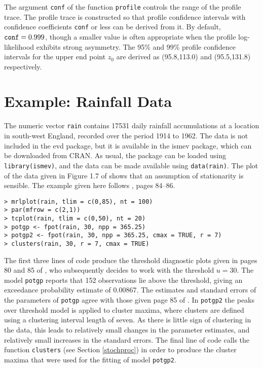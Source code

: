\documentclass[11pt,a4paper]{article}
\begin{document}
The argument \verb+conf+ of the function \verb+profile+ controls the range of the profile trace. 
The profile trace is constructed so that profile confidence intervals with confidence coefficients \verb+conf+ or less can be derived from it.
By default, $\verb+conf+ = 0.999$, though a smaller value is often appropriate when the profile log-likelihood exhibits strong asymmetry. 
The 95\% and 99\% profile confidence intervals for the upper end point $z_0$ are derived as (95.8,113.0) and (95.5,131.8) respectively. 

\section{Example: Rainfall Data}
\setcounter{footnote}{0}
\label{egrain}

The numeric vector \verb+rain+ contains 17531 daily rainfall accumulations at a location in south-west England, recorded over the period 1914 to 1962.
The data is not included in the evd package, but it is available in the ismev package, which can be downloaded from CRAN. 
As usual, the package can be loaded using \verb+library(ismev)+, and the data can be made available using \verb+data(rain)+. 
The plot of the data given in Figure 1.7 of \citet{cole01} shows that an assumption of stationarity is sensible.
The example given here follows \citet{cole01}, pages 84--86.

\begin{verbatim}
> mrlplot(rain, tlim = c(0,85), nt = 100)
> par(mfrow = c(2,1))
> tcplot(rain, tlim = c(0,50), nt = 20)
> potgp <- fpot(rain, 30, npp = 365.25)
> potgp2 <- fpot(rain, 30, npp = 365.25, cmax = TRUE, r = 7)
> clusters(rain, 30, r = 7, cmax = TRUE)
\end{verbatim}

The first three lines of code produce the threshold diagnostic plots given in pages 80 and 85 of \citet{cole01}, who subsequently decides to work with the threshold $u = 30$.
The model \verb+potgp+ reports that 152 observations lie above the threshold, giving an exceedance probability estimate of 0.00867.
The estimates and standard errors of the parameters of \verb+potgp+ agree with those given page 85 of \citet{cole01}.
In \verb+potgp2+ the peaks over threshold model is applied to cluster maxima, where clusters are defined using a clustering interval length of seven.
As there is little sign of clustering in the data, this leads to relatively small changes in the parameter estimates, and relatively small increases in the standard errors.
The final line of code calls the function \verb+clusters+ (see Section \ref{stochproc}) in order to produce the cluster maxima that were used for the fitting of model \verb+potgp2+. 
\end{document}
